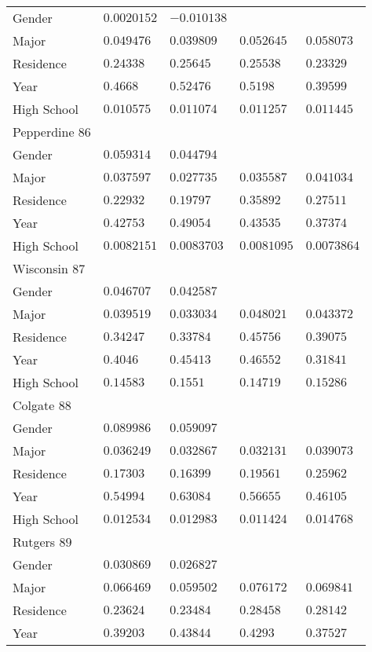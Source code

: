 \begin{center}
\begin{longtable}{|l|l|l|l|l|}
Gender & $0.0020152$ & $-0.010138$ & & \\
Major & $0.049476$ & $0.039809$ & $0.052645$ & $0.058073$ \\
Residence & $0.24338$ & $0.25645$ & $0.25538$ & $0.23329$ \\
Year & $0.4668$ & $0.52476$ & $0.5198$ & $0.39599$ \\
High School & $0.010575$ & $0.011074$ & $0.011257$ & $0.011445$ \\ \hline \hline
Pepperdine $86$ & & &   \\ \hline
Gender & $0.059314$ & $0.044794$ & & \\
Major & $0.037597$ & $0.027735$ & $0.035587$ & $0.041034$ \\
Residence & $0.22932$ & $0.19797$ & $0.35892$ & $0.27511$ \\
Year & $0.42753$ & $0.49054$ & $0.43535$ & $0.37374$ \\
High School & $0.0082151$ & $0.0083703$ & $0.0081095$ & $0.0073864$ \\ \hline \hline
Wisconsin $87$ & & &   \\ \hline
Gender & $0.046707$ & $0.042587$ & & \\
Major & $0.039519$ & $0.033034$ & $0.048021$ & $0.043372$ \\
Residence & $0.34247$ & $0.33784$ & $0.45756$ & $0.39075$ \\
Year & $0.4046$ & $0.45413$ & $0.46552$ & $0.31841$ \\
High School & $0.14583$ & $0.1551$ & $0.14719$ & $0.15286$ \\ \hline \hline
Colgate $88$ & & &   \\ \hline
Gender & $0.089986$ & $0.059097$ & & \\
Major & $0.036249$ & $0.032867$ & $0.032131$ & $0.039073$ \\
Residence & $0.17303$ & $0.16399$ & $0.19561$ & $0.25962$ \\
Year & $0.54994$ & $0.63084$ & $0.56655$ & $0.46105$ \\
High School & $0.012534$ & $0.012983$ & $0.011424$ & $0.014768$ \\ \hline \hline
Rutgers $89$ & & &   \\ \hline
Gender & $0.030869$ & $0.026827$ & & \\
Major & $0.066469$ & $0.059502$ & $0.076172$ & $0.069841$ \\
Residence & $0.23624$ & $0.23484$ & $0.28458$ & $0.28142$ \\
Year & $0.39203$ & $0.43844$ & $0.4293$ & $0.37527$ \\

\end{longtable}
\end{center}

